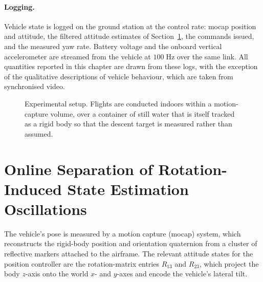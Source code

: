 \paragraph{Logging.}
Vehicle state is logged on the ground station at the control rate: mocap
position and attitude, the filtered attitude estimates of
Section~\ref{sec:nlms}, the commands issued, and the measured yaw rate.
Battery voltage and the onboard vertical accelerometer are streamed from the
vehicle at $100\;\mathrm{Hz}$ over the same link.  All quantities reported in
this chapter are drawn from these logs, with the exception of the
qualitative descriptions of vehicle behaviour, which are taken from
synchronised video.

\begin{figure}[t]
    \centering
    \caption{Experimental setup.  Flights are conducted indoors within a
    motion-capture volume, over a container of still water that is itself
    tracked as a rigid body so that the descent target is measured rather
    than assumed.}
    \label{fig:setup}
\end{figure}

\section{Online Separation of Rotation-Induced State Estimation Oscillations}
\label{sec:nlms}

The vehicle's pose is measured by a motion capture (mocap) system, which
reconstructs the rigid-body position and orientation quaternion from a cluster
of reflective markers attached to the airframe.  The relevant attitude states
for the position controller are the rotation-matrix entries $R_{13}$ and
$R_{23}$, which project the body $z$-axis onto the world $x$- and $y$-axes
and encode the vehicle's lateral tilt.

